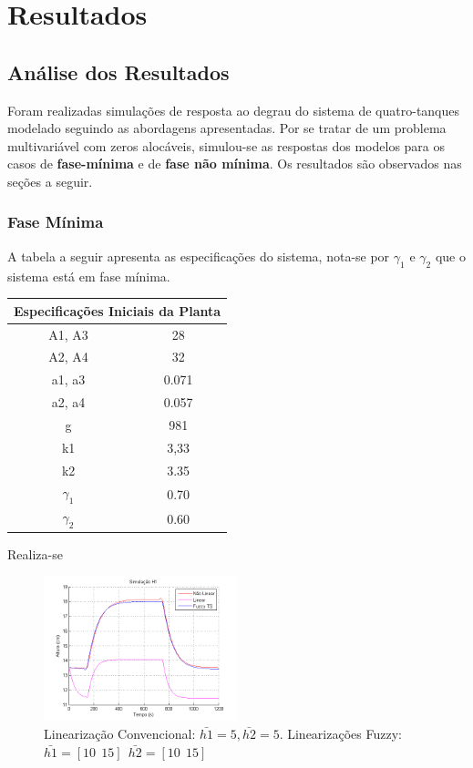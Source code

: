 %

\chapter{Resultados}

\section{Análise dos Resultados} \label{secAnalise}
Foram realizadas simulações de resposta ao degrau do sistema de quatro-tanques modelado seguindo as abordagens apresentadas. Por se tratar de um problema multivariável com zeros alocáveis, simulou-se as respostas dos modelos para os casos de \textbf{fase-mínima} e de \textbf{fase não mínima}. Os resultados são observados nas seções a seguir.

\subsection{Fase Mínima}
A tabela a seguir apresenta as especificações do sistema, nota-se por $\gamma_1$ e $\gamma_2$ que o sistema está em fase mínima.

\begin{center}
	\begin{tabular}{|c|c|}
		\hline
		\multicolumn{2}{|c|}{Especificações Iniciais da Planta} \\
		\hline
		A1, A3 & 28 \\ \hline
		A2, A4 & 32 \\ \hline
		a1, a3 & 0.071 \\ \hline
		a2, a4 & 0.057 \\ \hline
		g & 981 \\ \hline
		k1 & 3,33 \\ \hline
		k2 & 3.35 \\ \hline
		$\gamma_1$ & 0.70 \\ \hline
		$\gamma_2$ & 0.60 \\ \hline
		\hline
	\end{tabular}
\end{center}

Realiza-se
\begin{figure}[H]
	\includegraphics[width=0.5\textwidth]{img/FM_h1_5_10_15.png}
	\caption{\small Linearização Convencional: $ \bar{h1}=5, \bar{h2}=5$. Linearizações Fuzzy: $\bar{h1}=[10 \ \ 15] \ \ \bar{h2}=[10 \ \ 15]$ }
	\label{figH1FM_1}
\end{figure}

